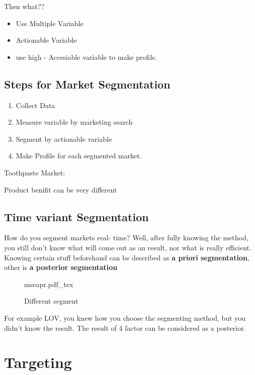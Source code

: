 \documentclass[12pt]{article}
\begin{document}
{\large Then what??}

\begin{itemize}
	\item Use Multiple Variable
	\item Actionable Variable
	\item use high - Accesiable variable to make profile.
\end{itemize}

\subsection{Steps for Market Segmentation}

\begin{enumerate}
	\item Collect Data
	\item Measure variable by marketing search
	\item Segment by actionable variable
	\item Make Profile for each segmented market.
\end{enumerate}


	Toothpaste Market:

\begin{tcolorbox}
	Product benifit can be very different


\end{tcolorbox}

\subsection{Time variant Segmentation}

How do you segment markets real- time? Well, after fully knowing the method, you still don't know what will come out as an result, nor what is really efficient.
Knowing certain stuff beforehand can be described as \textbf{a priori segmentation}, other is \textbf{a posterior segmentation}
\begin{figure}[H]
	\centering
	\def\svgwidth{\columnwidth}
	{mseapr.pdf_tex}
	\caption{Different segment}
	\label{fig:mseapr}
\end{figure}
For example LOV, you knew how you choose the segmenting method, but you didn't know the result. The result of 4 factor can be considered as a posterior.


\section{Targeting}
\end{document}
